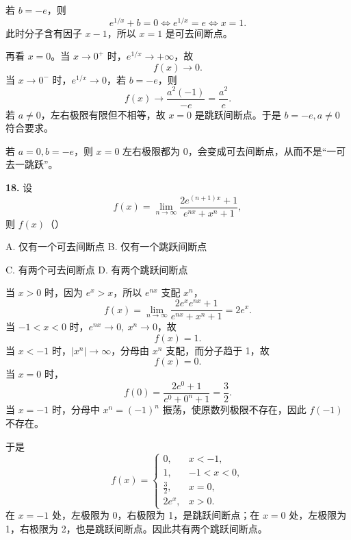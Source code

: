 \begin{solutionblock}
若 \(b=-e\)，则
\[
e^{1/x}+b=0
\iff e^{1/x}=e
\iff x=1.
\]
此时分子含有因子 \(x-1\)，所以 \(x=1\) 是可去间断点。

再看 \(x=0\)。当 \(x\to0^+\) 时，\(e^{1/x}\to+\infty\)，故
\[
f(x)\to0.
\]
当 \(x\to0^-\) 时，\(e^{1/x}\to0\)，若 \(b=-e\)，则
\[
f(x)\to\frac{a^2(-1)}{-e}=\frac{a^2}{e}.
\]
若 \(a\ne0\)，左右极限有限但不相等，故 \(x=0\) 是跳跃间断点。于是 \(b=-e,a\ne0\) 符合要求。

若 \(a=0,b=-e\)，则 \(x=0\) 左右极限都为 0，会变成可去间断点，从而不是“一可去一跳跃”。

\end{solutionblock}

\begin{problemblock}
\textbf{18.} 设
\[
f(x)=\lim_{n\to\infty}
\frac{2e^{(n+1)x}+1}{e^{nx}+x^n+1},
\]
则 \(f(x)\)（\quad）

A. 仅有一个可去间断点 \qquad B. 仅有一个跳跃间断点

C. 有两个可去间断点 \qquad D. 有两个跳跃间断点
\end{problemblock}

\begin{solutionblock}
当 \(x>0\) 时，因为 \(e^x>x\)，所以 \(e^{nx}\) 支配 \(x^n\)，
\[
f(x)=\lim_{n\to\infty}
\frac{2e^x e^{nx}+1}{e^{nx}+x^n+1}
=2e^x.
\]
当 \(-1<x<0\) 时，\(e^{nx}\to0,\ x^n\to0\)，故
\[
f(x)=1.
\]
当 \(x<-1\) 时，\(|x^n|\to\infty\)，分母由 \(x^n\) 支配，而分子趋于 1，故
\[
f(x)=0.
\]
当 \(x=0\) 时，
\[
f(0)=\frac{2e^0+1}{e^0+0^n+1}=\frac32.
\]
当 \(x=-1\) 时，分母中 \(x^n=(-1)^n\) 振荡，使原数列极限不存在，因此 \(f(-1)\) 不存在。

于是
\[
f(x)=
\begin{cases}
0,&x<-1,\\
1,&-1<x<0,\\
\frac32,&x=0,\\
2e^x,&x>0.
\end{cases}
\]
在 \(x=-1\) 处，左极限为 0，右极限为 1，是跳跃间断点；在 \(x=0\) 处，左极限为 1，右极限为 2，也是跳跃间断点。因此共有两个跳跃间断点。

\end{solutionblock}

